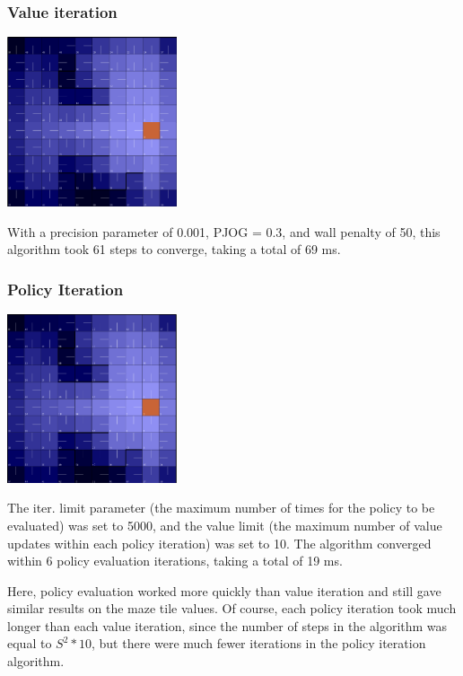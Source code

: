 \documentclass[11pt]{article}
\begin{document}
            \subsubsection{Value iteration}

            \includegraphics[width=5cm]{../images/small/vi.PNG}

            With a precision parameter of 0.001, PJOG = 0.3,
            and wall penalty of 50, this algorithm took 61 steps
            to converge, taking a total of 69 ms.

            \subsubsection{Policy Iteration}

            \includegraphics[width=5cm]{../images/small/pi.PNG}

            The iter. limit parameter (the maximum number
            of times for the policy to be evaluated) was set
            to 5000, and the value limit (the maximum number of
            value updates within each policy iteration) was
            set to 10. The algorithm converged within 6 policy
            evaluation iterations, taking a total of 19 ms.


            Here, policy evaluation worked more quickly than value iteration and
            still gave similar results on the maze tile values. Of course, each
            policy iteration took much longer than each value iteration,
            since the number of steps in the algorithm was equal to $S^2 * 10$,
            but there were much fewer iterations in the policy iteration algorithm.
\end{document}
